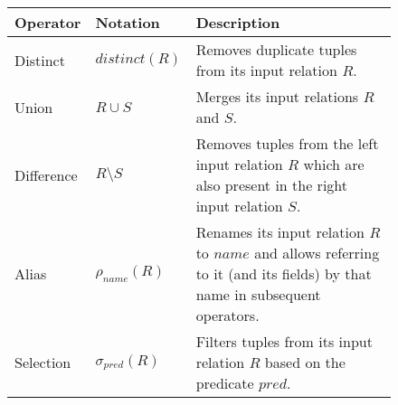 \begin{figure}[htpb]
    \centering
    \begin{tabular}{@{}p{}p{}p{}@{}}
        \toprule
        Operator           & Notation                                                    & Description                                                                                                                                                                                                                                                                                                       \\
        \midrule
        Distinct           & \(\mathit{distinct}(R)\)                                    & Removes duplicate tuples from its input relation \(R\).                                                                                                                                                                                                                                                           \\
        Union              & \(R \cup S\)                                                & Merges its input relations \(R\) and \(S\).                                                                                                                                                                                                                                                                       \\
        Difference         & \(R \setminus S\)                                           & Removes tuples from the left input relation \(R\) which are also present in the right input relation \(S\).                                                                                                                                                                                                       \\
        Alias              & \(\rho_\mathit{name}(R)\)                                   & Renames its input relation \(R\) to \(\mathit{name}\) and allows referring to it (and its fields) by that name in subsequent operators.                                                                                                                                                                           \\
        Selection          & \(\sigma_{\mathit{pred}}(R)\)                               & Filters tuples from its input relation \(R\) based on the predicate \(\mathit{pred}\).                                                                                                                                                                                                                            \\

\end{tabular}
\end{figure}
